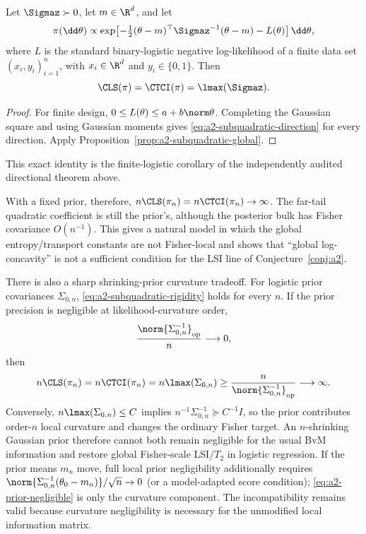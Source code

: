 \documentclass[../../main.tex]{subfiles}
\begin{document}
\begin{proposition}
\label{prop:a2-logistic-global}
Let $\Sigmaz\succ0$, let $m\in\R^d$, and let
\[
 \pi(\dd\theta)\propto
 \exp\!\left[-\tfrac12(\theta-m)^\top\Sigmaz^{-1}(\theta-m)-L(\theta)\right]\dd\theta,
\]
where $L$ is the standard binary-logistic negative log-likelihood of a finite data set
$(x_i,y_i)_{i=1}^n$, with $x_i\in\R^d$ and $y_i\in\{0,1\}$. Then
\[
  \CLS(\pi)=\CTCI(\pi)=\lmax(\Sigmaz).
\]
\end{proposition}

\begin{proof}
For finite design, $0\le L(\theta)\le a+b\norm\theta$. Completing the Gaussian square and using
Gaussian moments gives \eqref{eq:a2-subquadratic-direction} for every direction. Apply
Proposition~\ref{prop:a2-subquadratic-global}.
\end{proof}

This exact identity is the finite-logistic corollary of the independently audited directional
theorem above.

With a fixed prior, therefore, $n\CLS(\pi_n)=n\CTCI(\pi_n)\to\infty$. The far-tail quadratic
coefficient is still the prior's, although the posterior bulk has Fisher covariance $O(n^{-1})$.
This gives a natural model in which the global entropy/transport constants are not Fisher-local
and shows that ``global log-concavity'' is not a sufficient condition for the LSI line of
Conjecture~\ref{conj:a2}.

There is also a sharp shrinking-prior curvature tradeoff. For logistic prior covariances $\Sigma_{0,n}$,
\eqref{eq:a2-subquadratic-rigidity} holds for every $n$. If the prior precision is negligible at
likelihood-curvature order,
\begin{equation}\label{eq:a2-prior-negligible}
  \frac{\norm{\Sigma_{0,n}^{-1}}_{\rm op}}{n}\longrightarrow0,
\end{equation}
then
\begin{equation}\label{eq:a2-prior-tradeoff}
 n\CLS(\pi_n)=n\CTCI(\pi_n)
 =n\lmax(\Sigma_{0,n})
 \ge\frac{n}{\norm{\Sigma_{0,n}^{-1}}_{\rm op}}\longrightarrow\infty.
\end{equation}
Conversely, $n\lmax(\Sigma_{0,n})\le C$ implies
$n^{-1}\Sigma_{0,n}^{-1}\succeq C^{-1}I$, so the prior contributes order-$n$ local curvature and
changes the ordinary Fisher target. An $n$-shrinking Gaussian prior therefore cannot both remain
negligible for the usual BvM information and restore global Fisher-scale LSI/$T_2$ in logistic
regression.
If the prior means $m_n$ move, full local prior negligibility additionally requires
$\norm{\Sigma_{0,n}^{-1}(\theta_0-m_n)}/\sqrt n\to0$ (or a model-adapted score condition);
\eqref{eq:a2-prior-negligible} is only the curvature component. The incompatibility remains valid
because curvature negligibility is necessary for the unmodified local information matrix.
\end{document}

